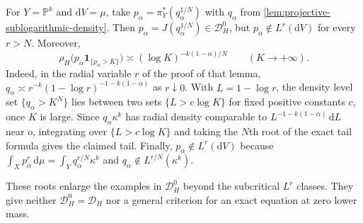 For $Y=\mathbb P^k$ and $\mathrm dV=\mu$, take $p_\alpha=\pi_Y^*(q_\alpha^{1/N})$ with $q_\alpha$ from \cref{lem:projective-sublogarithmic-density}. Then $p_\alpha=J(q_\alpha^{1/N})\in\mathcal D_H^0$, but $p_\alpha\notin L^r(\mathrm dV)$ for every $r>N$. Moreover,
\[
 \rho_H\bigl(p_\alpha\mathbf1_{\{p_\alpha>K\}}\bigr)
       \asymp(\log K)^{-k(1-\alpha)/N}\qquad(K\to+\infty).
\]
Indeed, in the radial variable $r$ of the proof of that lemma, $q_\alpha\asymp r^{-k}(1-\log r)^{-1-k(1-\alpha)}$ as $r\downarrow0$. With $L=1-\log r$, the density level set $\{q_\alpha>K^N\}$ lies between two sets $\{L>c\log K\}$ for fixed positive constants $c$, once $K$ is large. Since $q_\alpha\kappa^k$ has radial density comparable to $L^{-1-k(1-\alpha)}\,\mathrm dL$ near $o$, integrating over $\{L>c\log K\}$ and taking the $N$th root of the exact tail formula gives the claimed tail. Finally, $p_\alpha\notin L^r(\mathrm dV)$ because $\int_Xp_\alpha^r\,\mathrm d\mu=\int_Yq_\alpha^{r/N}\kappa^k$ and $q_\alpha\notin L^{r/N}(\kappa^k)$.

These roots enlarge the examples in $\mathcal D_H^0$ beyond the subcritical $L^r$ classes. They give neither $\mathcal D_H^0=\mathcal D_H$ nor a general criterion for an exact equation at zero lower mass.
